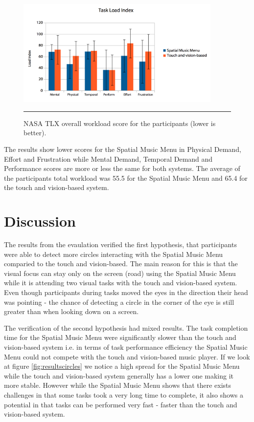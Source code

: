 \begin{figure}[h]
	\centering
		\includegraphics[width=0.9\textwidth,height=\textheight,keepaspectratio]{./Figures/results_taskloadindex.png}
		\rule{35em}{1pt}
	\caption[Results NASA TLX Score]{NASA TLX overall workload score for the participants (lower is better).}
	\label{fig:resultsnasatlx}
\end{figure}

The results show lower scores for the Spatial Music Menu in Physical Demand, Effort and Frustration while Mental Demand, Temporal Demand and Performance scores are more or less the same for both systems. The average of the participants total workload was 55.5 for the Spatial Music Menu and 65.4 for the touch and vision-based system.


\section{Discussion}
The results from the evaulation verified the first hypothesis, that participants were able to detect more circles interacting with the Spatial Music Menu comparied to the touch and vision-based. The main reason for this is that the visual focus can stay only on the screen (road) using the Spatial Music Menu while it is attending two visual tasks with the touch and vision-based system. Even though participants during tasks moved the eyes in the direction their head was pointing - the chance of detecting a circle in the corner of the eye is still greater than when looking down on a screen.

The verification of the second hypothesis had mixed results. The task completion time for the Spatial Music Menu were significantly slower than the touch and vision-based system i.e. in terms of task performance efficiency the Spatial Music Menu could not compete with the touch and vision-based music player. If we look at figure \ref{fig:resultscircles} we notice a high spread for the Spatial Music Menu while the touch and vision-based system generally has a lower one making it more stable. However while the Spatial Music Menu shows that there exists challenges in that some tasks took a very long time to complete, it also shows a potential in that tasks can be performed very fast - faster than the touch and vision-based system.


